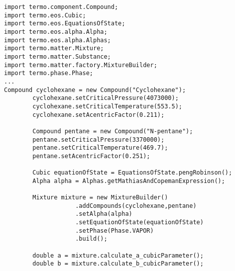 \begin{lstlisting}[caption=Cálculo de los parámetros de la ecuación de estado Soave Redlich Kwong y la expresión de $\alpha$ de mathias para el compuesto ]
import termo.component.Compound;
import termo.eos.Cubic;
import termo.eos.EquationsOfState;
import termo.eos.alpha.Alpha;
import termo.eos.alpha.Alphas;
import termo.matter.Mixture;
import termo.matter.Substance;
import termo.matter.factory.MixtureBuilder;
import termo.phase.Phase;
...
Compound cyclohexane = new Compound("Cyclohexane");
		cyclohexane.setCriticalPressure(4073000);
		cyclohexane.setCriticalTemperature(553.5);
		cyclohexane.setAcentricFactor(0.211);
		
		Compound pentane = new Compound("N-pentane");
		pentane.setCriticalPressure(3370000);
		pentane.setCriticalTemperature(469.7);
		pentane.setAcentricFactor(0.251);
		
		Cubic equationOfState = EquationsOfState.pengRobinson();
		Alpha alpha = Alphas.getMathiasAndCopemanExpression();
		
		Mixture mixture = new MixtureBuilder()
					.addCompounds(cyclohexane,pentane)
					.setAlpha(alpha)
					.setEquationOfState(equationOfState)
					.setPhase(Phase.VAPOR)
					.build();

		double a = mixture.calculate_a_cubicParameter();
		double b = mixture.calculate_b_cubicParameter();
\end{lstlisting}
